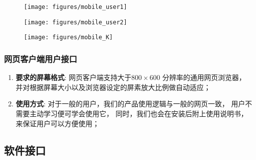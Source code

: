 \begin{figure}[h!]
  \centering

  \texttt{[image: figures/mobile\_user1]}

  \caption{  \label{fig:mobile_user1}
    }
\end{figure}
\begin{figure}[h!]
  \centering

  \texttt{[image: figures/mobile\_user2]}

  \caption{  \label{fig:mobile_user2}
    }
\end{figure}
\begin{figure}[h!]
  \centering

  \texttt{[image: figures/mobile\_K]}

  \caption{  \label{fig:mobile_K}
    }
\end{figure}
\fi

\subsubsection{网页客户端用户接口} %

\begin{enumerate}
	\item \textbf{要求的屏幕格式}:
		网页客户端支持大于$800 \times 600$ 分辨率的通用网页浏览器，
		并对根据屏幕大小以及浏览器设定的屏素放大比例做自动适应；
	\item \textbf{使用方式}:
		对于一般的用户，我们的产品使用逻辑与一般的网页一致，
			用户不需要主动学习便可学会使用它，
		同时，我们也会在安装后附上使用说明书，来保证用户可以方便使用；
\end{enumerate}

\subsection{软件接口}

